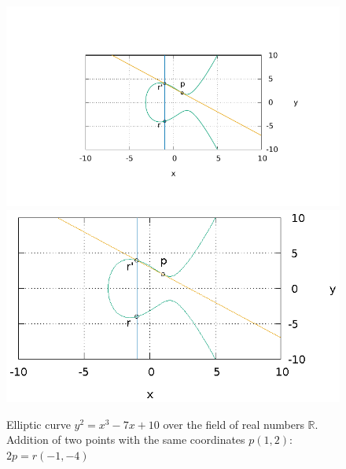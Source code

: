 \begin{figure}
\centering
\ifpdf
\includegraphics[angle=0,scale=1.5]
{./add/discretmath/picellipticsumeq2.pdf}
\else
\includegraphics[angle=0,scale=1.5]
{./add/discretmath/picellipticsumeq2.eps}
\fi
\caption{Elliptic curve $y^2 = x^3 -7 x + 10$ over the field
  of real numbers $\mathbb{R}$. Addition of two points with the same
  coordinates $p(1,2)$: $2p = r (-1,-4)$}
\label{fig:add:ellipticRsumEq2}
\end{figure}